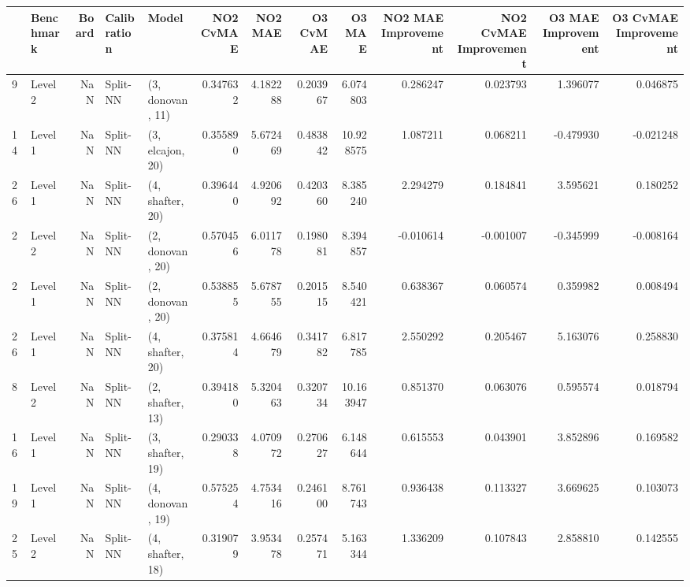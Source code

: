 \begin{tabular}{llrllrrrrrrrr}
\toprule
{} & Benchmark &  Board &    Calibration &             Model &  NO2 CvMAE &    NO2 MAE &  O3 CvMAE &     O3 MAE &  NO2 MAE Improvement &  NO2 CvMAE Improvement &  O3 MAE Improvement &  O3 CvMAE Improvement \\
\midrule
9  &   Level 2 &    NaN &       Split-NN &  (3, donovan, 11) &   0.347632 &   4.182288 &  0.203967 &   6.074803 &             0.286247 &               0.023793 &            1.396077 &              0.046875 \\
14 &   Level 1 &    NaN &       Split-NN &  (3, elcajon, 20) &   0.355890 &   5.672469 &  0.483842 &  10.928575 &             1.087211 &               0.068211 &           -0.479930 &             -0.021248 \\
26 &   Level 1 &    NaN &       Split-NN &  (4, shafter, 20) &   0.396440 &   4.920692 &  0.420360 &   8.385240 &             2.294279 &               0.184841 &            3.595621 &              0.180252 \\
2  &   Level 2 &    NaN &       Split-NN &  (2, donovan, 20) &   0.570456 &   6.011778 &  0.198081 &   8.394857 &            -0.010614 &              -0.001007 &           -0.345999 &             -0.008164 \\
2  &   Level 1 &    NaN &       Split-NN &  (2, donovan, 20) &   0.538855 &   5.678755 &  0.201515 &   8.540421 &             0.638367 &               0.060574 &            0.359982 &              0.008494 \\
26 &   Level 1 &    NaN &       Split-NN &  (4, shafter, 20) &   0.375814 &   4.664679 &  0.341782 &   6.817785 &             2.550292 &               0.205467 &            5.163076 &              0.258830 \\
8  &   Level 2 &    NaN &       Split-NN &  (2, shafter, 13) &   0.394180 &   5.320463 &  0.320734 &  10.163947 &             0.851370 &               0.063076 &            0.595574 &              0.018794 \\
16 &   Level 1 &    NaN &       Split-NN &  (3, shafter, 19) &   0.290338 &   4.070972 &  0.270627 &   6.148644 &             0.615553 &               0.043901 &            3.852896 &              0.169582 \\
19 &   Level 1 &    NaN &       Split-NN &  (4, donovan, 19) &   0.575254 &   4.753416 &  0.246100 &   8.761743 &             0.936438 &               0.113327 &            3.669625 &              0.103073 \\
25 &   Level 2 &    NaN &       Split-NN &  (4, shafter, 18) &   0.319079 &   3.953478 &  0.257471 &   5.163344 &             1.336209 &               0.107843 &            2.858810 &              0.142555 \\

\end{tabular}
